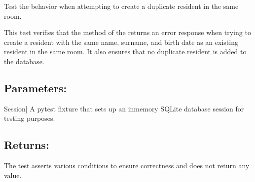 \documentclass[letterpaper,10pt,english]{sphinxmanual}
\begin{document}
\begin{fulllineitems}
\label{\detokenize{test:test.test_residetnt.test_create_resident_duplicate}}
\pysigstartsignatures
\pysiglinewithargsret
{}
{}
{}
\pysigstopsignatures
\sphinxAtStartPar
Test the behavior when attempting to create a duplicate resident in the same room.

\sphinxAtStartPar
This test verifies that the  method of the 
returns an error response when trying to create a resident with the same name,
surname, and birth date as an existing resident in the same room. It also ensures
that no duplicate resident is added to the database.


\subsection{Parameters:}
\label{\detokenize{test:parameters}}\begin{description}
\sphinxlineitem{setup\_database}{[}Session{]}
\sphinxAtStartPar
A pytest fixture that sets up an in\sphinxhyphen{}memory SQLite database session
for testing purposes.

\end{description}


\subsection{Returns:}
\label{\detokenize{test:returns}}\begin{description}
\sphinxAtStartPar
The test asserts various conditions to ensure correctness and does not
return any value.

\end{description}

\end{fulllineitems}

\end{document}
